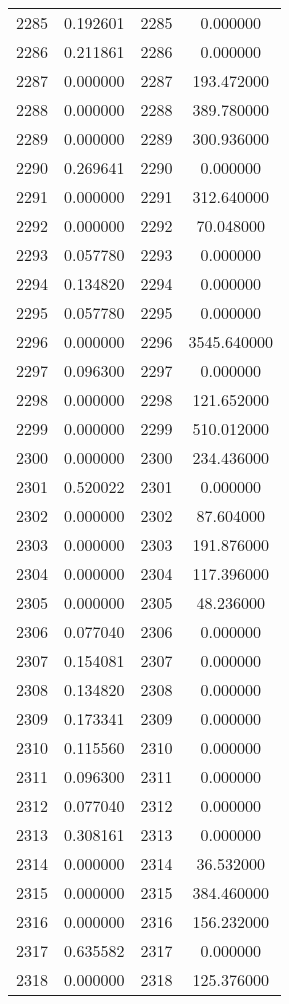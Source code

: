 \documentclass[12pt]{article}
\begin{document}
\begin{longtable}{@{}cccc@{}}
2285 & 0.192601 & 2285 & 0.000000 \\
2286 & 0.211861 & 2286 & 0.000000 \\
2287 & 0.000000 & 2287 & 193.472000 \\
2288 & 0.000000 & 2288 & 389.780000 \\
2289 & 0.000000 & 2289 & 300.936000 \\
2290 & 0.269641 & 2290 & 0.000000 \\
2291 & 0.000000 & 2291 & 312.640000 \\
2292 & 0.000000 & 2292 & 70.048000 \\
2293 & 0.057780 & 2293 & 0.000000 \\
2294 & 0.134820 & 2294 & 0.000000 \\
2295 & 0.057780 & 2295 & 0.000000 \\
2296 & 0.000000 & 2296 & 3545.640000 \\
2297 & 0.096300 & 2297 & 0.000000 \\
2298 & 0.000000 & 2298 & 121.652000 \\
2299 & 0.000000 & 2299 & 510.012000 \\
2300 & 0.000000 & 2300 & 234.436000 \\
2301 & 0.520022 & 2301 & 0.000000 \\
2302 & 0.000000 & 2302 & 87.604000 \\
2303 & 0.000000 & 2303 & 191.876000 \\
2304 & 0.000000 & 2304 & 117.396000 \\
2305 & 0.000000 & 2305 & 48.236000 \\
2306 & 0.077040 & 2306 & 0.000000 \\
2307 & 0.154081 & 2307 & 0.000000 \\
2308 & 0.134820 & 2308 & 0.000000 \\
2309 & 0.173341 & 2309 & 0.000000 \\
2310 & 0.115560 & 2310 & 0.000000 \\
2311 & 0.096300 & 2311 & 0.000000 \\
2312 & 0.077040 & 2312 & 0.000000 \\
2313 & 0.308161 & 2313 & 0.000000 \\
2314 & 0.000000 & 2314 & 36.532000 \\
2315 & 0.000000 & 2315 & 384.460000 \\
2316 & 0.000000 & 2316 & 156.232000 \\
2317 & 0.635582 & 2317 & 0.000000 \\
2318 & 0.000000 & 2318 & 125.376000 \\

\end{longtable}
\end{document}
